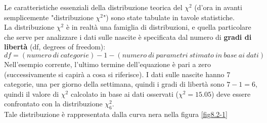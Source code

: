 \documentclass[10pt, draft]{book}
\begin{document}
Le caratteristiche essenziali della distribuzione teorica del $\chi^2$ (d'ora in avanti semplicemente "distribuzione $\chi^2$") sono state tabulate in tavole statistiche. %
\\
La distribuzione $\chi^2$ è in realtà una famiglia di distribuzioni, e quella particolare che serve per analizzare i dati sulle nascite è specificata dal numero di \textbf{gradi di libertà} (df, degrees of freedom):
\begin{equation}
df = (numero\ di\ categorie) -1 - (numero\ di\ parametri\ stimato\ in\ base\ ai\ dati)
\end{equation}
Nell'esempio corrente, l'ultimo termine dell'equazione è pari a zero (successivamente si capirà a cosa si riferisce). I dati sulle nascite hanno 7 categorie, una per giorno della settimana, quindi i gradi di libertà sono $7-1 = 6$, quindi il valore di $\chi^2$ calcolato in base ai dati osservati ($\chi^2 = 15.05$) deve essere confrontato con la distribuzione $\chi^2_6$.
\\
Tale distribuzione è rappresentata dalla curva nera nella figura \ref{fig8.2-1}
\end{document}
